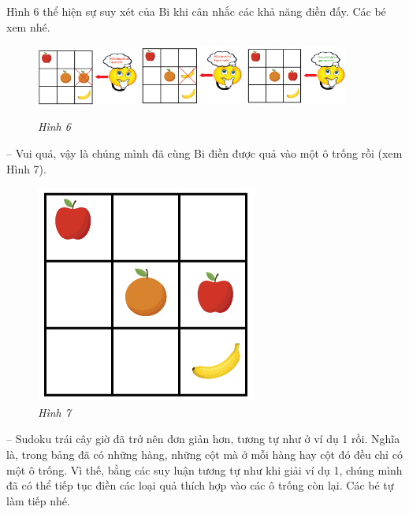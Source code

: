 	Hình 6 thể hiện sự suy xét của Bi khi cân nhắc các khả năng điền đấy. Các bé xem nhé.
	\begin{figure}[H]
		\centering
		\vspace*{-5pt}
		\captionsetup{labelformat= empty, justification=centering}
		\includegraphics[width=0.3\textwidth]{hinh6a}\hfill
		\includegraphics[width=0.3\textwidth]{hinh6b}\hfill
		\includegraphics[width=0.3\textwidth]{hinh6c}
		\caption{\small\textit{Hình 6}}
		\vspace*{-10pt}
	\end{figure}
	\begin{multicols}{2}
	-- Vui quá, vậy là chúng mình đã cùng Bi điền được quả vào một ô trống rồi (xem Hình 7).
		\begin{figure}[H]
		\vspace*{-5pt}
		\centering
		\captionsetup{labelformat=empty, justification=centering}
		\includegraphics[scale=0.4]{hinh7}
		\caption{\textit{\small Hình 7}}
		\vspace*{-5pt}
		\end{figure}
		-- Sudoku trái cây giờ đã trở nên đơn giản hơn, tương tự như ở ví dụ 1 rồi. Nghĩa là, trong bảng đã có những hàng, những cột mà ở mỗi hàng hay cột đó đều chỉ có một ô trống. Vì thế, bằng các suy luận tương tự như khi giải ví dụ 1, chúng mình đã có thể tiếp tục điền các loại quả thích hợp vào các ô trống còn lại. Các bé tự làm tiếp nhé.
	
	\end{multicols}
